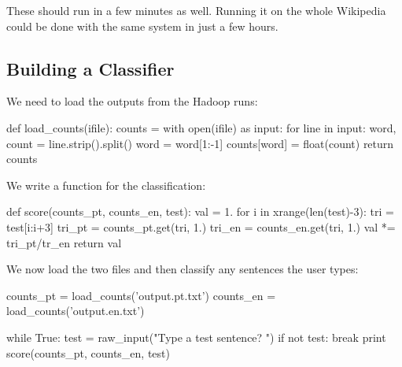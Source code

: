 These should run in a few minutes as well. Running it on the whole Wikipedia
could be done with the same system in just a few hours.

\subsection{Building a Classifier}

We need to load the outputs from the Hadoop runs:

\begin{python}
def load_counts(ifile):
    counts = {}
    with open(ifile) as input:
        for line in input:
            word, count = line.strip().split()
            word = word[1:-1]
            counts[word] = float(count)
    return counts
\end{python}

We write a function for the classification:

\begin{python}
def score(counts_pt, counts_en, test):
    val = 1.
    for i in xrange(len(test)-3):
        tri = test[i:i+3]
        tri_pt = counts_pt.get(tri, 1.)
        tri_en = counts_en.get(tri, 1.)
        val *= tri_pt/tr_en
    return val
\end{python}

We now load the two files and then classify any sentences the user types:

\begin{python}
counts_pt = load_counts('output.pt.txt')
counts_en = load_counts('output.en.txt')

while True:
    test = raw_input("Type a test sentence? ")
    if not test: break
    print score(counts_pt, counts_en, test)
\end{python}


